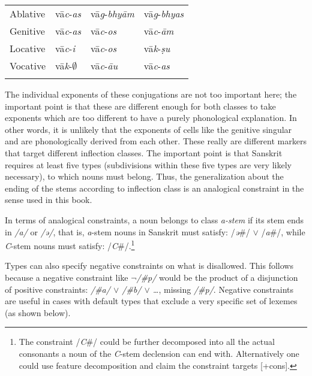 \begin{table}
\begin{tabular}{llll}
      Ablative     & vā\textit{c}-\textit{as}          & vā\textit{g}-\textit{bhyām} & vā\textit{g}-\textit{bhyas} \\
      Genitive     & vā\textit{c}-\textit{as}          & vā\textit{c}-\textit{os}    & vā\textit{c}-\textit{ām}    \\
      Locative     & vā\textit{c}-\textit{i }          & vā\textit{c}-\textit{os}    & vā\textit{k}-\textit{ṣu}    \\
      Vocative     & vā\textit{k}-$\emptyset$ & vā\textit{c}-\textit{āu}    & vā\textit{c}-\textit{as}    \\
      \lspbottomrule
    \end{tabular}
\end{table}

The individual exponents of these conjugations are not too important here; the important point is that these are different enough for both classes to take exponents which are too different to have a purely phonological explanation. In other words, it is unlikely that the exponents of cells like the genitive singular  and  are phonologically derived from each other. These really are different markers that target different inflection classes. The important point is that Sanskrit requires at least five  types (subdivisions within these five types are very likely necessary), to which nouns must belong. Thus, the generalization about the ending of the stems according to inflection class is an analogical constraint in the sense used in this book.

In terms of analogical constraints, a noun belongs to class \textit{a-stem} if its stem ends in \textit{/a/} or \textit{/ə/}, that is, \textit{a}-stem nouns in Sanskrit must satisfy: /\textit{ə}\#/ $\lor$ /\textit{a}\#/, while \textit{C}-stem nouns must satisfy: /\textit{C}\#/.\footnote{The constraint /\textit{C}\#/ could be further decomposed into all the actual consonants a noun of the \textit{C}-stem declension can end with. Alternatively one could use feature decomposition and claim the constraint targets [+cons].}

Types can also specify negative constraints on what is disallowed. This follows because a negative constraint like \textit{$\lnot$/\#p/} would be the product of a disjunction of positive constraints: \textit{/\#a/ $\lor$ /\#b/ $\lor$ \dots}, missing \textit{/\#p/}. Negative constraints are useful in cases with default types that exclude a very specific set of lexemes (as shown below). 

